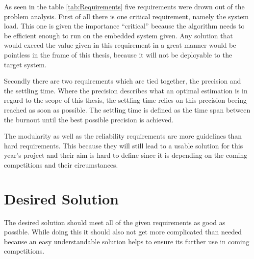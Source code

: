  As seen in the table \ref{tab:Requirements} five requirements were drown out of the problem analysis.
 First of all there is one critical requirement, namely the system load. This one is given the importance ``critical'' because the algorithm needs to be efficient enough to run on the embedded system given.
 Any solution that would exceed the value given in this requirement in a great manner would be pointless in the frame of this thesis, because it will not be deployable to the target system.

 Secondly there are two requirements which are tied together, the precision and the settling time.
 Where the precision describes what an optimal estimation is in regard to the scope of this thesis, the settling time relies on this precision beeing reached as soon as possible.
 The settling time is defined as the time span between the burnout until the best possible precision is achieved.

 The modularity as well as the reliability requirements are more guidelines than hard requirements.
 This because they will still lead to a usable solution for this year's project and their aim is hard to define since it is depending on the coming competitions and their circumstances.

 \section{Desired Solution}
 The desired solution should meet all of the given requirements as good as possible.
 While doing this it should also not get more complicated than needed because an easy understandable solution helps to ensure its further use in coming competitions.
